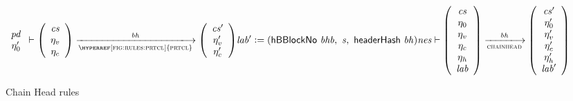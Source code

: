 \begin{figure}[ht]
\begin{equation}
{      {
        {\begin{array}{c}
            \var{pd} \\
            \eta_0' \\
         \end{array}}
        \vdash
        {\left(\begin{array}{c}
              \var{cs} \\
              \eta_v \\
              \eta_c \\
        \end{array}\right)}
        \trans{\hyperref[fig:rules:prtcl]{prtcl}}{\var{bh}}
        {\left(\begin{array}{c}
              \var{cs'} \\
              \eta_v' \\
              \eta_c' \\
        \end{array}\right)}
      } \\~\\~\\
      \var{lab'}\leteq (\hBBlockNo{bhb},~\var{s},~\headerHash{bh} ) \\
    }
    {
      \var{nes}
      \vdash
      {\left(\begin{array}{c}
            \var{cs} \\
            \eta_0 \\
            \eta_v \\
            \eta_c \\
            \eta_h \\
            \var{lab} \\
      \end{array}\right)}
      \trans{chainhead}{\var{bh}}
      {\left(\begin{array}{c}
            \var{cs}' \\
            \eta_0' \\
            \eta_v' \\
            \eta_c' \\
            \eta_h' \\
            \var{lab}' \\
      \end{array}\right)}
    }
  \end{equation}
  \caption{Chain Head rules}
  \label{fig:rules:chainhead}
\end{figure}

